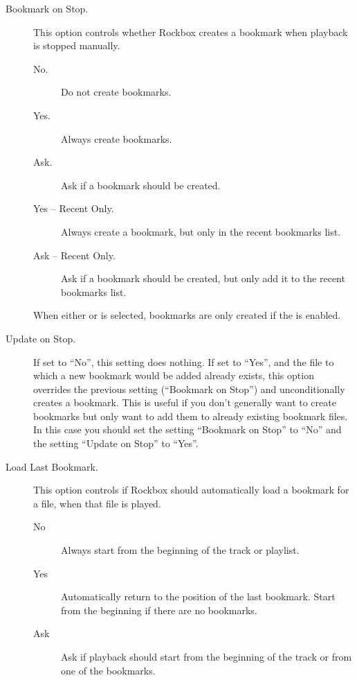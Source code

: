   \begin{description}

  \item [Bookmark on Stop.]
    This option controls whether Rockbox creates a bookmark when playback is
    stopped manually.
    \begin{description}    
      \item[No.]
            Do not create bookmarks.
      \item[Yes.]
            Always create bookmarks.
      \item[Ask.]
            Ask if a bookmark should be created.
      \item[Yes -- Recent Only.]
            Always create a bookmark, but only in the recent bookmarks list.
      \item[Ask -- Recent Only.]
            Ask if a bookmark should be created, but only add it to the recent
            bookmarks list.
    \end{description}
    When either  or 
    is selected, bookmarks are only created if the  is enabled.
    
  \item [Update on Stop.]
    If set to ``No'', this setting does nothing. If set to ``Yes'', and the file
    to which a new bookmark would be added already exists, this option overrides
    the previous setting (``Bookmark on Stop'') and unconditionally creates a
    bookmark. This is useful if you don't generally want to create bookmarks but
    only want to add them to already existing bookmark files. In this case you
    should set the setting ``Bookmark on Stop'' to ``No'' and the setting ``Update
    on Stop'' to ``Yes''.

  \item [Load Last Bookmark.]
    This option controls if Rockbox should automatically load a bookmark for
    a file, when that file is played.
    
    \begin{description}
      \item[No]
            Always start from the beginning of the track or playlist.
      \item[Yes]
            Automatically return to the position of the last bookmark. Start
            from the beginning if there are no bookmarks.
      \item[Ask]
            Ask if playback should start from the beginning of the track or
            from one of the bookmarks.
    \end{description}


\end{description}
